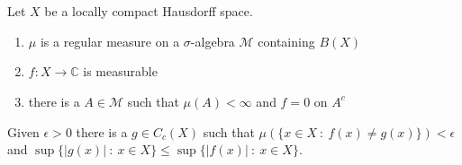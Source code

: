 
\chapter{}

\begin{theorem}
  Let $X$ be a locally compact Hausdorff space.
  \begin{enumerate}[label=(\arabic*)]
    \item $\mu$ is a regular measure on a $\sigma$-algebra
      $\mathcal{M}$ containing $B(X)$
    \item $f: X \to \mathbb{C}$ is measurable
    \item there is a $A \in \mathcal{M}$ such that $\mu(A) < \infty$
      and $f = 0$ on $A^c$
  \end{enumerate}
  Given $\epsilon> 0$ there is a $g \in C_c(X)$ such that $
  \mu(\{ x \in X  \ : \  f(x) \neq g(x) \}) < \epsilon$ and $\sup \{
  |g(x)|  \ : \ x \in X \} \le \sup \{ |f(x)| \ : \  x \in X \}$.
\end{theorem}
